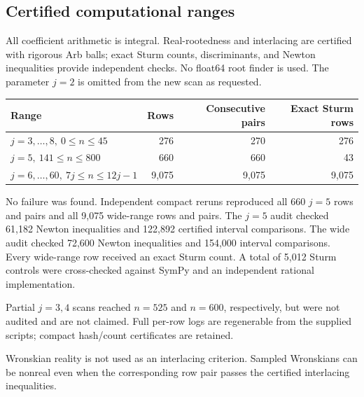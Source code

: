 \subsection{Certified computational ranges}

All coefficient arithmetic is integral. Real-rootedness and interlacing are
certified with rigorous Arb balls; exact Sturm counts, discriminants, and
Newton inequalities provide independent checks. No float64 root finder is
used. The parameter \(j=2\) is omitted from the new scan as requested.

\begin{center}
\begin{tabular}{lrrr}
\toprule
Range & Rows & Consecutive pairs & Exact Sturm rows \\
\midrule
\(j=3,\ldots,8,\ 0\le n\le45\) & 276 & 270 & 276 \\
\(j=5,\ 141\le n\le800\) & 660 & 660 & 43 \\
\(j=6,\ldots,60,\ 7j\le n\le12j-1\) & 9{,}075 & 9{,}075 & 9{,}075 \\
\bottomrule
\end{tabular}
\end{center}

No failure was found. Independent compact reruns reproduced all 660 \(j=5\)
rows and pairs and all 9,075 wide-range rows and pairs. The \(j=5\) audit checked 61,182 Newton inequalities and
122,892 certified interval comparisons. The wide audit checked 72,600 Newton
inequalities and 154,000 interval comparisons. Every wide-range row received
an exact Sturm count. A total of 5,012 Sturm controls were cross-checked
against SymPy and an independent rational implementation.

Partial \(j=3,4\) scans reached \(n=525\) and \(n=600\), respectively, but
were not audited and are not claimed. Full per-row logs are regenerable from
the supplied scripts; compact hash/count certificates are retained.

Wronskian reality is not used as an interlacing criterion. Sampled Wronskians
can be nonreal even when the corresponding row pair passes the certified
interlacing inequalities.
